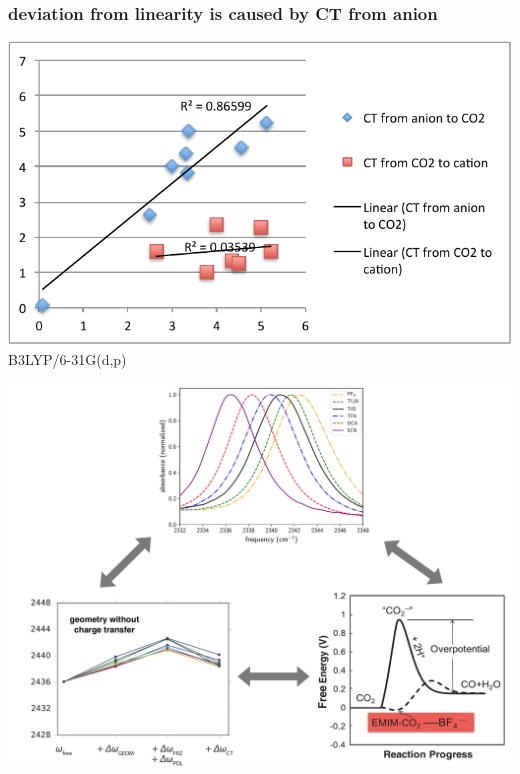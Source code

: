 \documentclass[xcolor=usenames,dvipsnames,svgnames]{beamer}
\begin{document}
\begin{frame}
  \frametitle{ deviation from linearity is caused by CT from anion}
  \centering
  \includegraphics[width=\linewidth,keepaspectratio]{./figures/angle_vs_ct_to_from.pdf}
  \scriptsize
  B3LYP/6-31G(d,p)
\end{frame}

\begin{frame}
  \includegraphics[width=0.90\linewidth,keepaspectratio]{./figures/application_of_ct2.pdf}
\end{frame}
\end{document}
